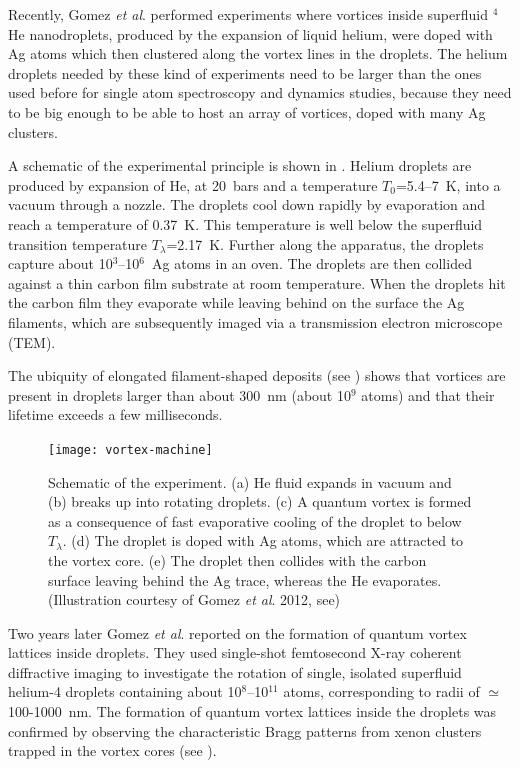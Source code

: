 	Recently, Gomez \emph{et al}. performed experiments\citep{Gomez:2012} where vortices inside superfluid $^4$He nanodroplets, produced by the expansion of liquid helium, were doped with Ag atoms which then clustered along the vortex lines in the droplets. The helium droplets needed by these kind of experiments need to be larger than the ones used before for single atom spectroscopy and dynamics studies, because they need to be big enough to be able to host an array of vortices, doped with many Ag clusters.
	
	A schematic of the experimental principle is shown in . Helium droplets are produced by expansion of He, at 20~bars and a temperature $T_0$=5.4--7~K, into a vacuum through a nozzle. The droplets cool down rapidly by evaporation and reach a temperature of 0.37~K\citep{Hartmann1995}. This temperature is well below the superfluid transition temperature $T_\lambda$=2.17~K\citep{Don91,Pit03}. Further along the apparatus, the droplets capture about 10$^3$–10$^6$~Ag atoms in an oven\citep{Log11d}. The droplets are then collided against a thin carbon film substrate at room temperature\citep{Log11d}. When the droplets hit the carbon film they evaporate while leaving behind on the surface the Ag filaments, which are subsequently imaged via a transmission electron microscope (TEM).
	
	The ubiquity of elongated filament-shaped deposits (see ) shows that vortices are present in droplets larger than about 300~nm (about 10$^9$ atoms) and that their lifetime exceeds a few milliseconds.
	
	\begin{figure}[t]
		\begin{center}
			\texttt{[image: vortex-machine]}
			\caption{Schematic of the experiment. (a) He fluid expands in vacuum and (b) breaks up into rotating droplets. (c) A quantum vortex is formed as a consequence of fast evaporative cooling of the droplet to below $T_\lambda$. (d) The droplet is doped with Ag atoms, which are attracted to the vortex core. (e) The droplet then collides with the carbon surface leaving behind the Ag trace, whereas the He evaporates. (Illustration courtesy of Gomez \emph{et al}. 2012, see)}
			\label{fig:vortex-machine}
		\end{center}
	\end{figure}	
	
	Two years later Gomez \emph{et al}. reported\citep{Gom14} on the formation of quantum vortex lattices inside droplets. They used single-shot femtosecond X-ray coherent diffractive imaging to investigate the rotation of single, isolated superfluid helium-4 droplets containing about 10$^8$--10$^{11}$ atoms, corresponding to radii of $\simeq$100-1000~nm. The formation of quantum vortex lattices inside the droplets was confirmed by observing the characteristic Bragg patterns from xenon clusters trapped in the vortex cores (see ).

